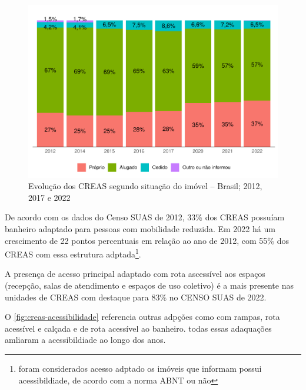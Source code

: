 \documentclass[
  brazilian]{report}
\begin{document}
\begin{figure}
\includegraphics{Censo-SUAS-2022_files/figure-latex/creas-situacao-1} \caption[Evolução dos CREAS segundo situação do imóvel – Brasil]{Evolução dos CREAS segundo situação do imóvel – Brasil; 2012, 2017 e 2022}\label{fig:creas-situacao}
\end{figure}

De acordo com os dados do Censo SUAS de 2012, 33\% dos CREAS possuíam
banheiro adaptado para pessoas com mobilidade reduzida. Em 2022 há um
crescimento de 22 pontos percentuais em relação ao ano de 2012, com 55\%
dos CREAS com essa estrutura
adptada\footnote{foram considerados acesso adptado os imóveis que informam possui acessibildiade, de acordo com a norma ABNT ou não}.

A presença de acesso principal adaptado com rota ascessível aos espaços
(recepção, salas de atendimento e espaços de uso coletivo) é a mais
presente nas unidades de CREAS com destaque para 83\% no CENSO SUAS de
2022.

O \cref{fig:creas-acessibilidade} referencia outras adpções como com
rampas, rota acessível e calçada e de rota acessível ao banheiro. todas
essas adaquações amliaram a acessibildiade ao longo dos anos.
\end{document}

